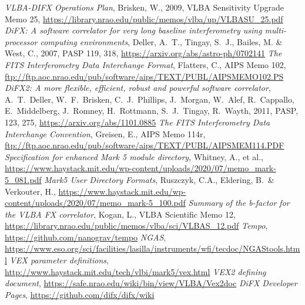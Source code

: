 \begin{thebibliography}{}
	{\it VLBA-DIFX Operations Plan}, Brisken, W., 2009, VLBA Sensitivity Upgrade Memo 25, \url{https://library.nrao.edu/public/memos/vlba/up/VLBASU_25.pdf}
	{\it DiFX: A software correlator for very long baseline interferometry using multi-processor computing environments}, Deller, A.~T., Tingay, S.~J., Bailes, M. \& West, C., 2007, PASP 119, 318, \url{https://arxiv.org/abs/astro-ph/0702141}
	{\it The FITS Interferometry Data Interchange Format}, Flatters, C., AIPS Memo 102, \url{ftp://ftp.aoc.nrao.edu/pub/software/aips/TEXT/PUBL/AIPSMEMO102.PS}
	{\it DiFX2: A more flexible, efficient, robust and powerful software correlator}, A.\ T.\ Deller, W.\ F.\ Brisken, C.\ J.\ Phillips, J.\ Morgan, W.\ Alef, R.\ Cappallo, E.\ Middelberg, J.\ Romney, H.\ Rottmann, S.\ J.\ Tingay, R.\ Wayth, 2011, PASP, 123, 275, \url{https://arxiv.org/abs/1101.0885}
	{\it The FITS Interferometry Data Interchange Convention}, Greisen, E., AIPS Memo 114r, \url{ftp://ftp.aoc.nrao.edu/pub/software/aips/TEXT/PUBL/AIPSMEM114.PDF}
	{\it Specification for enhanced Mark 5 module directory}, Whitney, A., et al., \url{https://www.haystack.mit.edu/wp-content/uploads/2020/07/memo_mark-5_081.pdf}
	{\it  	Mark5 User Directory Formats}, Ruszczyk, C.A., Eldering, B.\ \& Verkouter, H., \url{https://www.haystack.mit.edu/wp-content/uploads/2020/07/memo_mark-5_100.pdf}
	{\it Summary of the b-factor for the VLBA FX correlator}, Kogan, L., VLBA Scientific Memo 12, \url{https://library.nrao.edu/public/memos/vlba/sci/VLBAS_12.pdf}
	{\it Tempo}, \url{https://github.com/nanograv/tempo}
	{\it NGAS}, \url{https://www.eso.org/sci/facilities/lasilla/instruments/wfi/tecdoc/NGAStools.html}
	{\it VEX parameter definitions}, \url{http://www.haystack.mit.edu/tech/vlbi/mark5/vex.html}
	{\it VEX2 defining document}, \url{https://safe.nrao.edu/wiki/bin/view/VLBA/Vex2doc}
	{\it DiFX Developer Pages}, \url{https://github.com/difx/difx/wiki}
\end{thebibliography}
